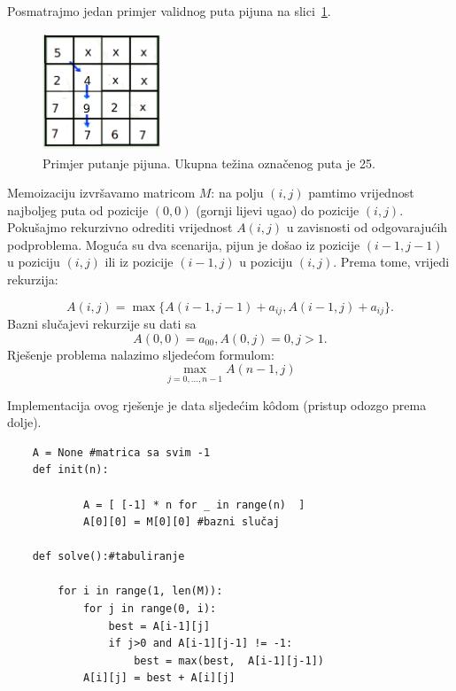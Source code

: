 \begin{solution}
	Posmatrajmo jedan primjer validnog puta pijuna na slici~\ref{fig:pijun-putanja}. 
	
	
	\begin{figure}
		\centering
		\includegraphics[width=100pt,height=100pt]{slike/dp-table-1.png}
		\caption{Primjer putanje pijuna. Ukupna težina označenog puta je 25.} \label{fig:pijun-putanja}
	\end{figure}

Memoizaciju izvršavamo matricom $M$: na polju $(i , j)$ pamtimo
vrijednost najboljeg puta od pozicije $(0, 0)$ (gornji lijevi ugao) do pozicije $(i , j)$. Pokušajmo   rekurzivno odrediti vrijednost $A(i,j)$ u zavisnosti od odgovarajućih podproblema. Moguća su dva scenarija, pijun je  došao iz pozicije $(i-1, j-1)$ u poziciju $(i,j)$ ili iz pozicije $(i-1, j)$ u poziciju $(i, j)$. Prema tome, vrijedi rekurzija: 

\begin{equation}
	A(i,j) = \max\{ A(i-1, j-1) + a_{ij}, A(i-1, j) + a_{ij}   \}.
\end{equation}
Bazni slučajevi rekurzije su dati sa 
\begin{equation}
	A(0, 0) = a_{00}, A(0, j) = 0, j > 1.
\end{equation}
Rješenje problema nalazimo sljedećom formulom:
\begin{equation}
	\max_{j=0, \ldots, n-1}A(n-1, j)
\end{equation}

Implementacija ovog rješenje je data sljedećim k\^odom (pristup odozgo prema dolje).

\begin{verbatim}
	A = None #matrica sa svim -1
	def init(n):
        
            A = [ [-1] * n for _ in range(n)  ]
            A[0][0] = M[0][0] #bazni slučaj
	
	def solve():#tabuliranje
	
	    for i in range(1, len(M)):
	        for j in range(0, i):
	            best = A[i-1][j]  
	            if j>0 and A[i-1][j-1] != -1:
	                best = max(best,  A[i-1][j-1])
	        A[i][j] = best + A[i][j]
	 

\end{verbatim}
\end{solution}
